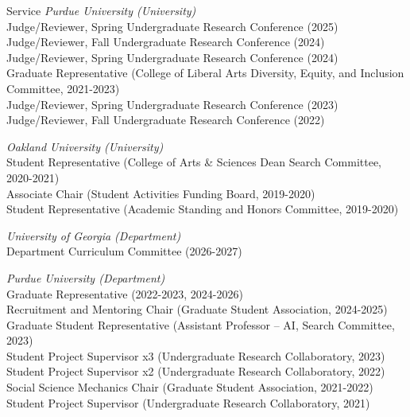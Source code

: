\documentclass{resume} %
\begin{document}
\begin{rSection}{Service}
{\it Purdue University (University)}
\\Judge/Reviewer, Spring Undergraduate Research Conference (2025)
\\Judge/Reviewer, Fall Undergraduate Research Conference (2024)
\\Judge/Reviewer, Spring Undergraduate Research Conference (2024)
\\Graduate Representative (College of Liberal Arts Diversity, Equity, and Inclusion Committee, 2021-2023)
\\Judge/Reviewer, Spring Undergraduate Research Conference (2023)
\\Judge/Reviewer, Fall Undergraduate Research Conference (2022)

{\it Oakland University (University)} 
\\Student Representative (College of Arts \& Sciences Dean Search Committee, 2020-2021)
\\Associate Chair (Student Activities Funding Board, 2019-2020)
\\Student Representative (Academic Standing and Honors Committee, 2019-2020)

{\it University of Georgia (Department)}  
\\Department Curriculum Committee (2026-2027) 

{\it Purdue University (Department)}  
\\Graduate Representative (2022-2023, 2024-2026) 
\\Recruitment and Mentoring Chair (Graduate Student Association, 2024-2025)
\\Graduate Student Representative (Assistant Professor -- AI, Search Committee, 2023)
\\Student Project Supervisor x3 (Undergraduate Research Collaboratory, 2023)
\\Student Project Supervisor x2 (Undergraduate Research Collaboratory, 2022)
\\Social Science Mechanics Chair (Graduate Student Association, 2021-2022)
\\Student Project Supervisor (Undergraduate Research Collaboratory, 2021)
\end{rSection}

\end{document}

